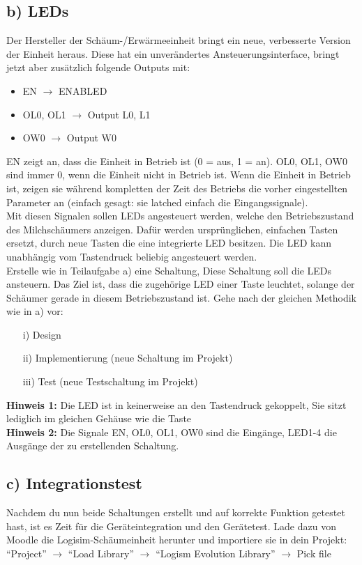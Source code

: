 \documentclass[a4paper]{scrartcl}
\begin{document}
\subsection*{b) LEDs}
Der Hersteller der Schäum-/Erwärmeeinheit bringt ein neue, verbesserte Version der Einheit heraus. Diese hat ein unverändertes Ansteuerungsinterface, 
bringt jetzt aber zusätzlich folgende Outputs mit:
\begin{itemize}
	\item EN $\rightarrow$ ENABLED
	\item OL0, OL1 $\rightarrow$ Output L0, L1
	\item OW0 $\rightarrow$ Output W0
\end{itemize}
EN zeigt an, dass die Einheit in Betrieb ist (0 = aus, 1 = an). OL0, OL1, OW0 sind immer 0, wenn die Einheit nicht in Betrieb ist.
Wenn die Einheit in Betrieb ist, zeigen sie während kompletten der
Zeit des Betriebs die vorher eingestellten Parameter an (einfach gesagt: sie latched einfach die Eingangssignale).\\


Mit diesen Signalen sollen LEDs angesteuert werden, welche den Betriebszustand des Milchschäumers anzeigen.
Dafür werden ursprünglichen, einfachen Tasten ersetzt, durch neue Tasten die eine integrierte LED besitzen.
Die LED kann unabhängig vom Tastendruck beliebig angesteuert werden.\\


Erstelle wie in Teilaufgabe a) eine Schaltung,
Diese Schaltung soll die LEDs ansteuern. Das Ziel ist, dass die zugehörige LED einer Taste leuchtet,
solange der Schäumer gerade in diesem Betriebszustand ist.
Gehe nach der gleichen Methodik wie in a) vor:
\begin{itemize}
	\item[i)] Design
	\item[ii)] Implementierung (neue Schaltung im Projekt)
	\item[iii)] Test (neue Testschaltung im Projekt)
\end{itemize}
\textbf{Hinweis 1:} Die LED ist in keinerweise an den Tastendruck gekoppelt, Sie sitzt lediglich im gleichen Gehäuse wie die Taste\\
\textbf{Hinweis 2:} Die Signale EN, OL0, OL1, OW0 sind die Eingänge, LED1-4 die Ausgänge der zu erstellenden Schaltung.

\subsection*{c) Integrationstest}
Nachdem du nun beide Schaltungen erstellt und auf korrekte Funktion getestet hast, ist es Zeit für die Geräteintegration und den Gerätetest.
Lade dazu von Moodle die Logisim-Schäumeinheit herunter und importiere sie in dein Projekt:\\
``Project'' $\rightarrow$ ``Load Library'' $\rightarrow$  ``Logism Evolution Library'' $\rightarrow$ Pick file
\end{document}

